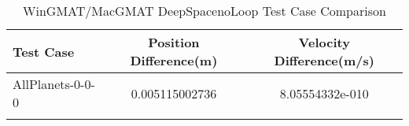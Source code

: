\begin{table}[htbp!]
\centering
\caption{ WinGMAT/MacGMAT DeepSpacenoLoop Test Case Comparison}
      \begin{tabular}{lcc}
      \hline\hline
          Test Case & Position Difference(m) & Velocity Difference(m/s) \\
         \hline
         AllPlanets-0-0-0 & 0.005115002736 & 8.05554332e-010 \\
      \hline\hline
      \label{Table: DeepSpacenoLoop WinGMAT-MacGMAT Table} 
\end{tabular}
\end{table}
